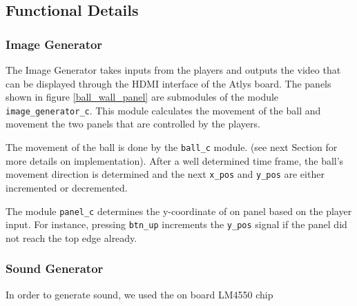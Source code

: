 
	\newpage	
	\subsection{Functional Details}
		\subsubsection{Image Generator}
		The Image Generator takes inputs from the players and outputs the video that can be displayed through the HDMI interface of the Atlys board. The panels shown in figure \ref{ball_wall_panel} are submodules of the module \texttt{image\_generator\_c}.
		This module calculates the movement of the ball and movement the two panels that are controlled by the players. 
		
		The movement of the ball is done by the \texttt{ball\_c} module. (see next Section for more details on implementation).
		After a well determined time frame, the ball's movement direction is determined and the next \texttt{x\_pos} and \texttt{y\_pos} are either incremented or decremented. 
		
		The module \texttt{panel\_c} determines the y-coordinate of on panel based on the player input. For instance, pressing \texttt{btn\_up} increments the \texttt{y\_pos} signal if the panel did not reach the top edge already. 


		  \subsubsection{Sound Generator}
				In order to generate sound, we used the on board LM4550 chip
		  
\newpage
	
